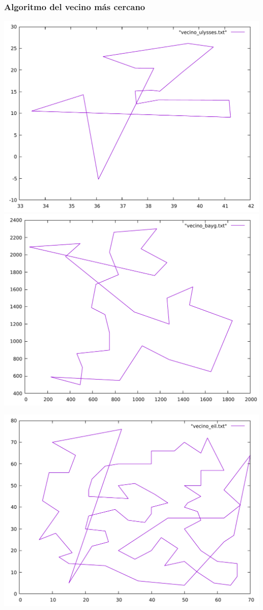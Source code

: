 \documentclass[13pt]{beamer}
\begin{document}
	\begin{frame}
		\frametitle{Algoritmo del vecino más cercano}
			\includegraphics[scale=0.2]{../src/vecino_ulysses.pdf}
			\includegraphics[scale=0.2]{../src/vecino_bayg.pdf}
			\begin{center}
				\includegraphics[scale=0.2]{../src/vecino_eil.pdf}
			\end{center}
	\end{frame}
\end{document}
